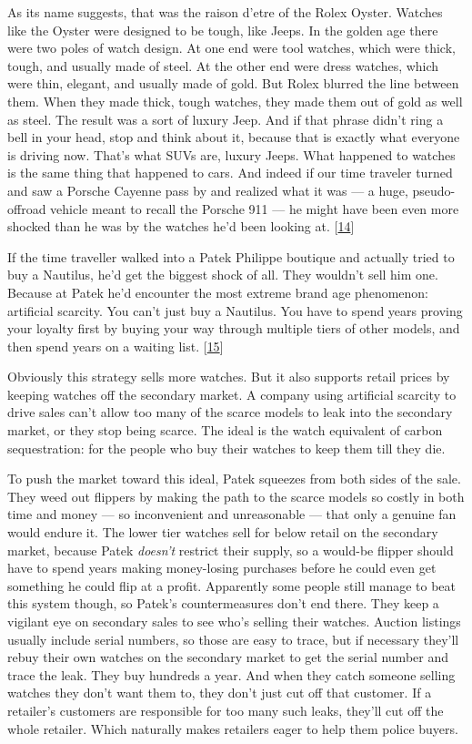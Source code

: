 As its name suggests, that was the raison d'etre of the Rolex Oyster.
Watches like the Oyster were designed to be tough, like Jeeps. In the
golden age there were two poles of watch design. At one end were tool
watches, which were thick, tough, and usually made of steel. At the
other end were dress watches, which were thin, elegant, and usually made
of gold. But Rolex blurred the line between them. When they made thick,
tough watches, they made them out of gold as well as steel. The result
was a sort of luxury Jeep. And if that phrase didn't ring a bell in your
head, stop and think about it, because that is exactly what everyone is
driving now. That's what SUVs are, luxury Jeeps. What happened to
watches is the same thing that happened to cars. And indeed if our time
traveler turned and saw a Porsche Cayenne pass by and realized what it
was --- a huge, pseudo-offroad vehicle meant to recall the Porsche 911
--- he might have been even more shocked than he was by the watches he'd
been looking at. {[}\hyperref[f14n]{14}{]}

If the time traveller walked into a Patek Philippe boutique and actually
tried to buy a Nautilus, he'd get the biggest shock of all. They
wouldn't sell him one. Because at Patek he'd encounter the most extreme
brand age phenomenon: artificial scarcity. You can't just buy a
Nautilus. You have to spend years proving your loyalty first by buying
your way through multiple tiers of other models, and then spend years on
a waiting list. {[}\hyperref[f15n]{15}{]}

Obviously this strategy sells more watches. But it also supports retail
prices by keeping watches off the secondary market. A company using
artificial scarcity to drive sales can't allow too many of the scarce
models to leak into the secondary market, or they stop being scarce. The
ideal is the watch equivalent of carbon sequestration: for the people
who buy their watches to keep them till they die.

To push the market toward this ideal, Patek squeezes from both sides of
the sale. They weed out flippers by making the path to the scarce models
so costly in both time and money --- so inconvenient and unreasonable
--- that only a genuine fan would endure it. The lower tier watches sell
for below retail on the secondary market, because Patek \emph{doesn't}
restrict their supply, so a would-be flipper should have to spend years
making money-losing purchases before he could even get something he
could flip at a profit. Apparently some people still manage to beat this
system though, so Patek's countermeasures don't end there. They keep a
vigilant eye on secondary sales to see who's selling their watches.
Auction listings usually include serial numbers, so those are easy to
trace, but if necessary they'll rebuy their own watches on the secondary
market to get the serial number and trace the leak. They buy hundreds a
year. And when they catch someone selling watches they don't want them
to, they don't just cut off that customer. If a retailer's customers are
responsible for too many such leaks, they'll cut off the whole retailer.
Which naturally makes retailers eager to help them police buyers.

